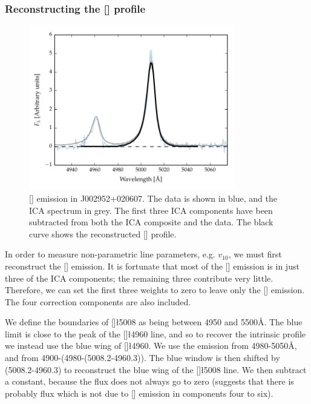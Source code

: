 \subsubsection{Reconstructing the [] profile}

\begin{figure}
    \centering
    \includegraphics[width=0.8\textwidth]{figures/chapter04/oiii_reconstruction.pdf} 
    \caption[{[] emission in J002952+020607.}]{[] emission in J002952+020607. The data is shown in blue, and the ICA spectrum in grey. The first three ICA components have been subtracted from both the ICA composite and the data. The black curve shows the reconstructed [] profile.}     
    \label{fig:oiii_reconstruction}
\end{figure}

In order to measure non-parametric line parameters, e.g. $v_{10}$, we must first reconstruct the [] emission. 
It is fortunate that most of the [] emission is in just three of the ICA components; the remaining three contribute very little. 
Therefore, we can set the first three weights to zero to leave only the [] emission. 
The four correction components are also included. 

We define the boundaries of []\l5008 as being between 4950 and 5500\AA. 
The blue limit is close to the peak of the []\l4960 line, and so to recover the intrinsic profile we instead use the blue wing of []\l4960. 
We use the emission from 4980-5050\AA, and from 4900-(4980-(5008.2-4960.3)). 
The blue window is then shifted by (5008.2-4960.3) to reconstruct the blue wing of the []\l5008 line. 
We then subtract a constant, because the flux does not always go to zero (suggests that there is probably flux which is not due to [] emission in components four to six). 

